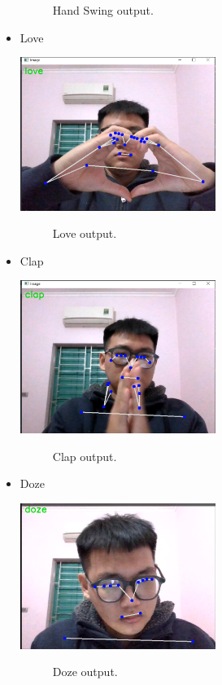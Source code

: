 \begin{itemize}
\begin{figure}[h!]
    	\caption[Hand Swing output .]{Hand Swing output.}
    	\label{hand.png} 
        \end{figure}
    \item Love

        \includegraphics[width=0.5\textwidth]{Figures/love.PNG}
        \begin{figure}[h!]
    	\centering
    	
    	\caption[Love output .]{Love output.}
    	\label{love.png} 
        \end{figure}
        
    \item Clap

        \includegraphics[width=0.5\textwidth]{Figures/clap.PNG}
        \begin{figure}[h!]
    	\centering
    	
    	\caption[Clap output .]{Clap output.}
    	\label{clap.png} 
        \end{figure}

    \item Doze

        \includegraphics[width=0.5\textwidth]{Figures/doze.PNG}
        \begin{figure}[h!]
    	\centering
    	
    	\caption[Doze output .]{Doze output.}
    	\label{doze.png} 
        \end{figure}
\end{itemize}

